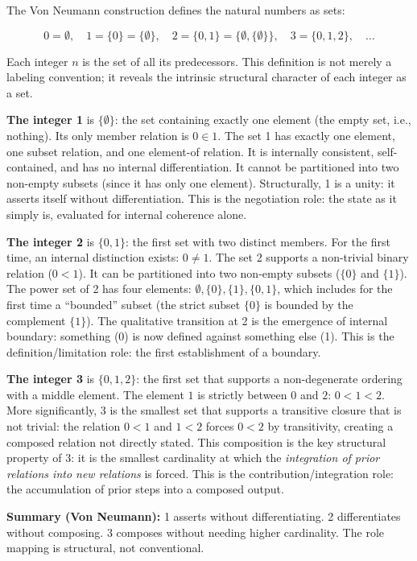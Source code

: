 \documentclass[12pt]{article}
\begin{document}
The Von Neumann construction defines the natural numbers as sets:

\[0 = \emptyset, \quad 1 = \{0\} = \{\emptyset\}, \quad 2 = \{0,1\} = \{\emptyset, \{\emptyset\}\}, \quad 3 = \{0,1,2\}, \quad \ldots\]

Each integer \(n\) is the set of all its predecessors. This definition
is not merely a labeling convention; it reveals the intrinsic structural
character of each integer as a set.

\textbf{The integer 1} is \(\{\emptyset\}\): the set containing exactly
one element (the empty set, i.e., nothing). Its only member relation is
\(0 \in 1\). The set 1 has exactly one element, one subset relation, and
one element-of relation. It is internally consistent, self-contained,
and has no internal differentiation. It cannot be partitioned into two
non-empty subsets (since it has only one element). Structurally, 1 is a
unity: it asserts itself without differentiation. This is the
negotiation role: the state as it simply is, evaluated for internal
coherence alone.

\textbf{The integer 2} is \(\{0, 1\}\): the first set with two distinct
members. For the first time, an internal distinction exists:
\(0 \neq 1\). The set 2 supports a non-trivial binary relation
(\(0 < 1\)). It can be partitioned into two non-empty subsets (\(\{0\}\)
and \(\{1\}\)). The power set of 2 has four elements:
\(\emptyset, \{0\}, \{1\}, \{0,1\}\), which includes for the first time
a ``bounded'' subset (the strict subset \(\{0\}\) is bounded by the
complement \(\{1\}\)). The qualitative transition at 2 is the emergence
of internal boundary: something (0) is now defined against something
else (1). This is the definition/limitation role: the first
establishment of a boundary.

\textbf{The integer 3} is \(\{0, 1, 2\}\): the first set that supports a
non-degenerate ordering with a middle element. The element \(1\) is
strictly between \(0\) and \(2\): \(0 < 1 < 2\). More significantly, 3
is the smallest set that supports a transitive closure that is not
trivial: the relation \(0 < 1\) and \(1 < 2\) forces \(0 < 2\) by
transitivity, creating a composed relation not directly stated. This
composition is the key structural property of 3: it is the smallest
cardinality at which the \emph{integration of prior relations into new
relations} is forced. This is the contribution/integration role: the
accumulation of prior steps into a composed output.

\textbf{Summary (Von Neumann):} 1 asserts without differentiating. 2
differentiates without composing. 3 composes without needing higher
cardinality. The role mapping is structural, not conventional.
\end{document}
